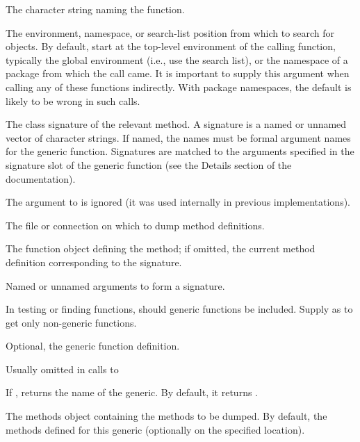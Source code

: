 \begin{Arguments}
\begin{ldescription}
\item[\code{f}]  The character string naming the function. 
\item[\code{where}]  The environment, namespace, or search-list position
from which to search for objects.  By default, start at the
top-level environment of the calling function, typically the global
environment (i.e., use the search list), or the namespace of a
package from which the call came.  It is important to supply this
argument when calling any of these functions indirectly.  With
package namespaces, the default is likely to be wrong in such calls.

\item[\code{signature}]  The class signature of the relevant method.  A
signature is a named or unnamed vector of character strings.  If
named, the names must be formal argument names for the generic
function.  Signatures are matched to the arguments specified in
the signature slot of the generic function (see the Details
section of the  documentation). 

The  argument to  is ignored (it
was used internally in previous implementations).

\item[\code{file}]  The file or connection on which to dump method definitions. 

\item[\code{def}]  The function object defining the method; if omitted, the
current method definition corresponding to the signature. 

\item[\code{...}] Named or unnamed arguments to form a signature.

\item[\code{generic}] In testing or finding functions, should generic
functions be included.  Supply as  to get only
non-generic functions.

\item[\code{fdef}] Optional, the generic function definition.

Usually omitted in calls to 

\item[\code{getName}] If ,  returns the name of
the generic.  By default, it returns . 
\item[\code{methods}] 
The methods object containing the methods to be dumped.  By default,
the methods defined for this generic (optionally on the specified
 location).


\end{ldescription}
\end{Arguments}
